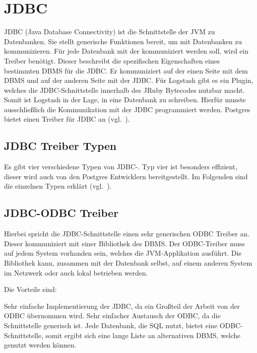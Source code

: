 \section{JDBC}
\gls{JDBC} (Java Database Connectivity) ist die Schnittstelle der \gls{JVM} zu
Datenbanken. Sie stellt generische Funktionen bereit, um mit Datenbanken zu
kommunizieren. Für jede Datenbank mit der kommuniziert werden soll, wird ein
\gls{Treiber} benötigt. Dieser beschreibt die spezifischen Eigenschaften eines
bestimmten \gls{DBMS} für die \gls{JDBC}\@. Er kommuniziert auf der einen Seite
mit dem \gls{DBMS} und auf der anderen Seite mit der \gls{JDBC}\@. Für Logstash
gibt es ein Plugin, welches die \gls{JDBC}\hyp{}Schnittstelle innerhalb des
JRuby Bytecodes nutzbar macht. Somit ist Logstash in der Lage, in eine
Datenbank zu schreiben. Hierfür musste ausschließlich die Kommunikation mit der
\gls{JDBC} programmiert werden. Postgres bietet einen \gls{Treiber} für
\gls{JDBC} an (vgl.~\cite{postgres-jdbc}).
\tm%

\subsection{JDBC Treiber Typen}
Es gibt vier verschiedene Typen von
\gls{JDBC}\hyp{}. Typ vier ist besonders effizient,
dieser wird auch von den Postgres Entwicklern bereitgestellt. Im Folgenden sind
die einzelnen Typen erklärt (vgl.~\cite{jdbc-types}).
\tm%

\subsection{JDBC-ODBC Treiber}
Hierbei spricht die \gls{JDBC}\hyp{}Schnittstelle einen sehr generischen
\gls{ODBC} \gls{Treiber} an. Dieser kommuniziert mit einer Bibliothek des
\gls{DBMS}\@. Der \gls{ODBC}\hyp{}\gls{Treiber} muss auf jedem System vorhanden
sein, welches die \gls{JVM}\hyp{}Applikation ausführt. Die Bibliothek kann,
zusammen mit der Datenbank selbst, auf einem anderen System im Netzwerk oder
auch lokal betrieben werden.

Die Vorteile sind:

\begin{outline}
  \1 Sehr einfache Implementierung der \gls{JDBC}, da ein Großteil der Arbeit
  von der \gls{ODBC} übernommen wird.
  \1 Sehr einfacher Austausch der \gls{ODBC}, da die Schnittstelle generisch
  ist.
  \1 Jede Datenbank, die \gls{SQL} nutzt, bietet eine
  \gls{ODBC}\hyp{}Schnittstelle, somit ergibt sich eine lange Liste an
  alternativen \gls{DBMS}, welche genutzt werden können.
\end{outline}

